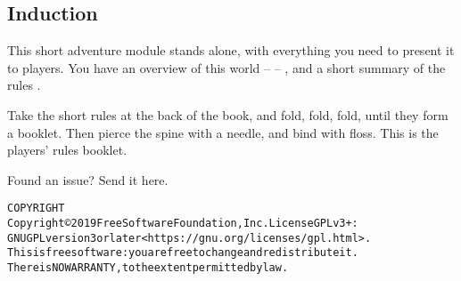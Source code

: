 \subsection*{Induction}

\begin{multicols}{2}
\noindent
This short adventure module stands alone, with everything you need to present it to players.
You have an overview of this world --  -- , and a short summary of the rules .

Take the short rules at the back of the book, and fold, fold, fold, until they form a booklet.
Then pierce the spine with a needle, and bind with floss.
This is the players' rules booklet.

\begin{center}
  
  Found an issue?
  Send it here.
\end{center}

\end{multicols}

\begin{alltt}
COPYRIGHT
       Copyright \copyright 2019 Free Software Foundation, Inc.  License GPLv3+:
  GNU GPL version 3 or later <https://gnu.org/licenses/gpl.html>.
       This is free software: you are free to change and redistribute it.
  There is NO WARRANTY, to the extent permitted by law.

\end{alltt}

